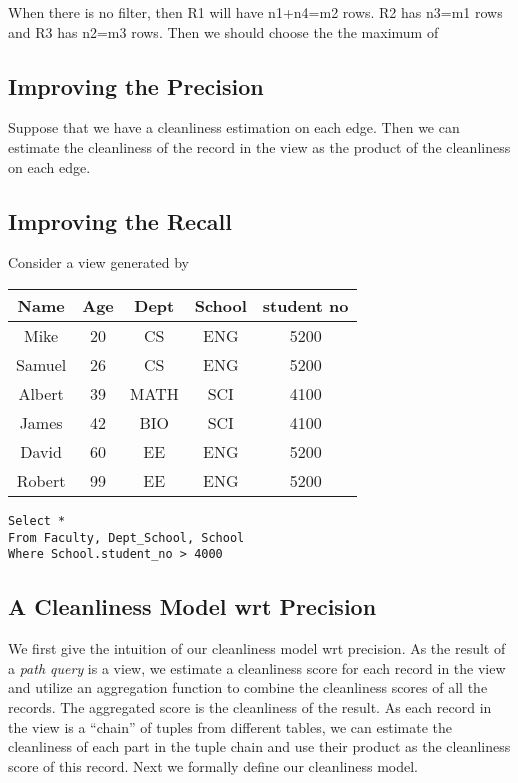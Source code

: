 When there is no filter, then R1 will have n1+n4=m2 rows. R2 has n3=m1 rows and R3 has n2=m3 rows. Then we should choose the the maximum of 

\subsection{Improving the Precision}
Suppose that we have a cleanliness estimation on each edge. Then we can estimate the cleanliness of the record in the view as the product of the cleanliness on each edge.

\subsection{Improving the Recall}
Consider a view generated by 

\begin{table}
\centering
\begin{tabular}{|c|c|c|c|c|} \hline
Name & Age & Dept & School & student no \\\hline
Mike & 20  & CS   & ENG &  5200 \\\hline
Samuel & 26  & CS   & ENG &  5200 \\\hline
Albert & 39  & MATH & SCI &  4100 \\\hline
James  & 42  & BIO  & SCI &  4100 \\\hline
David  & 60  & EE   & ENG &  5200 \\\hline
Robert & 99  & EE   & ENG &  5200 \\\hline
\end{tabular}
\end{table}

\lstset{language=SQL}
\begin{lstlisting}
Select *
From Faculty, Dept_School, School
Where School.student_no > 4000
\end{lstlisting}


\subsection{A Cleanliness Model wrt Precision}\label{subsec:model:precision}


We first give the intuition of our cleanliness model wrt precision. As the
result of a \emph{path query} is a view, we estimate a cleanliness score for
each record in the view and utilize an aggregation function to combine the
cleanliness scores of all the records. The aggregated score is the cleanliness
of the result. As each record in the view is a ``chain'' of tuples from
different tables, we can estimate the cleanliness of each part in the tuple
chain and use their product as the cleanliness score of this record. Next we
formally define our cleanliness model.


